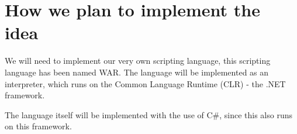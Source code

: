 \section*{How we plan to implement the idea}
We will need to implement our very own scripting language, this scripting language has been named WAR.
The language will be implemented as an interpreter, which runs on the Common Language Runtime (CLR) - the .NET framework.

The language itself will be implemented with the use of C#, since this also runs on this framework.
